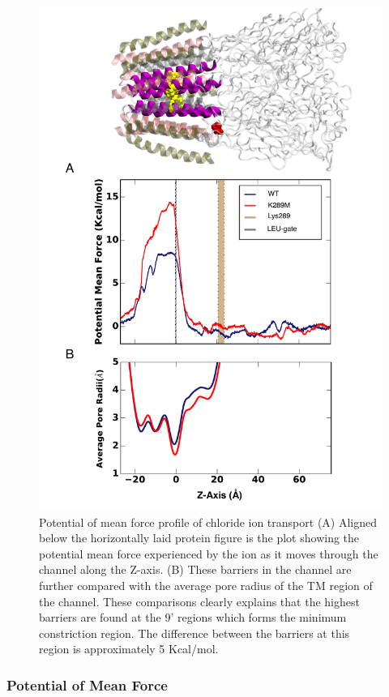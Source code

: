 \documentclass[9pt,twocolumn,twoside,lineno]{pnas-new}
\begin{document}
\begin{figure}
\centering
\includegraphics[width = .5\textwidth]{figures/ABF_pic_2.pdf}
\caption{ Potential of mean force profile of chloride ion transport  (A) Aligned below the horizontally laid protein figure is the plot showing the potential mean force experienced by the ion as it moves through the channel along the Z-axis. (B) These barriers in the channel are further compared with the average pore radius of the TM region of the channel. These comparisons clearly explains that the highest barriers are found at the 9' regions which forms the minimum constriction region. The difference between the barriers at this region is approximately 5 Kcal/mol.}
\label{fig:abf}
\end{figure}

\subsubsection*{Potential of Mean Force}
\end{document}
